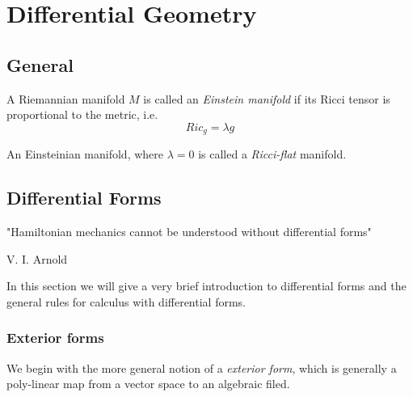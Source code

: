 \chapter{Differential Geometry}
\adjustmtc
\minitoc
\section{General}
\begin{definition}
A Riemannian manifold $M$ is called an \textit{Einstein manifold} if its Ricci tensor is proportional to the metric, i.e.
\begin{equation}
Ric_g = \lambda g
\end{equation}
\end{definition}
\begin{remark}
An Einsteinian manifold, where $\lambda=0$ is called a \textit{Ricci-flat} manifold.
\end{remark}

\section{Differential Forms}
\epigraph{"Hamiltonian mechanics cannot be understood without differential
forms"}{V. I. Arnold}

In this section we will give a very brief introduction to differential forms
and the general rules for calculus with differential forms. 
\subsection{Exterior forms}
We begin with the more general notion of a \textit{exterior form}, which is
generally a poly-linear map from a vector space to an algebraic filed.

